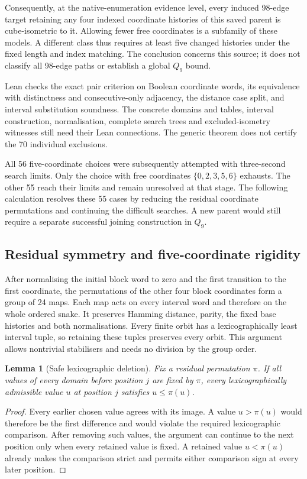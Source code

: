 \documentclass[11pt,a4paper]{article}
\newtheorem{lemma}[theorem]{Lemma}
\theoremstyle{definition}
\theoremstyle{remark}
\begin{document}
Consequently, at the native-enumeration evidence level, every induced
98-edge target retaining any four indexed coordinate histories of
this saved parent is cube-isometric to it. Allowing fewer free
coordinates is a subfamily of these models. A different class thus
requires at least five changed histories under the fixed length and
index matching. The conclusion concerns this source; it does not
classify all 98-edge paths or establish a global $Q_9$ bound.

Lean checks the exact pair criterion on Boolean coordinate words,
its equivalence with distinctness and consecutive-only adjacency,
the distance case split, and interval substitution soundness.
The concrete domains and tables, interval construction, normalisation,
complete search trees and excluded-isometry witnesses still need
their Lean connections. The generic theorem does not certify the
70 individual exclusions.

All 56 five-coordinate choices were subsequently attempted with
three-second search limits. Only the choice with free coordinates
$\{0,2,3,5,6\}$ exhausts. The other 55 reach their limits and remain
unresolved at that stage. The following calculation resolves these
55 cases by reducing the residual coordinate permutations and
continuing the difficult searches. A new parent would still require
a separate successful joining construction in $Q_9$.

\subsection{Residual symmetry and five-coordinate rigidity}
\label{sec:history207}
After normalising the initial block word to zero and the first
transition to the first coordinate, the permutations of the other
four block coordinates form a group of 24 maps. Each map acts on
every interval word and therefore on the whole ordered snake.
It preserves Hamming distance, parity, the fixed base histories
and both normalisations. Every finite orbit has a lexicographically
least interval tuple, so retaining these tuples preserves every orbit.
This argument allows nontrivial stabilisers and needs no division
by the group order.

\begin{lemma}[Safe lexicographic deletion]
Fix a residual permutation $\pi$. If all values of every domain
before position $j$ are fixed by $\pi$, every lexicographically
admissible value $u$ at position $j$ satisfies $u\le\pi(u)$.
\end{lemma}
\begin{proof}
Every earlier chosen value agrees with its image. A value
$u>\pi(u)$ would therefore be the first difference and would
violate the required lexicographic comparison. After removing
such values, the argument can continue to the next position only
when every retained value is fixed. A retained value $u<\pi(u)$
already makes the comparison strict and permits either comparison
sign at every later position.
\end{proof}
\end{document}
